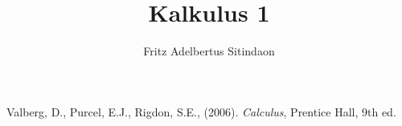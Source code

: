 \documentclass{article}
\title{Kalkulus 1}
\author{Fritz Adelbertus Sitindaon}
\date{}
\newcommand{\ds}{\displaystyle}
\begin{document}



% 
% 
% 
% 
% 
% 
% 
% 
% 
% 
% 
% 

% 
% 
% 

\begin{thebibliography}{9}
Valberg, D., Purcel, E.J., Rigdon, S.E., (2006). \emph{Calculus}, Prentice Hall, 9th ed.
\end{thebibliography}
\end{document}

